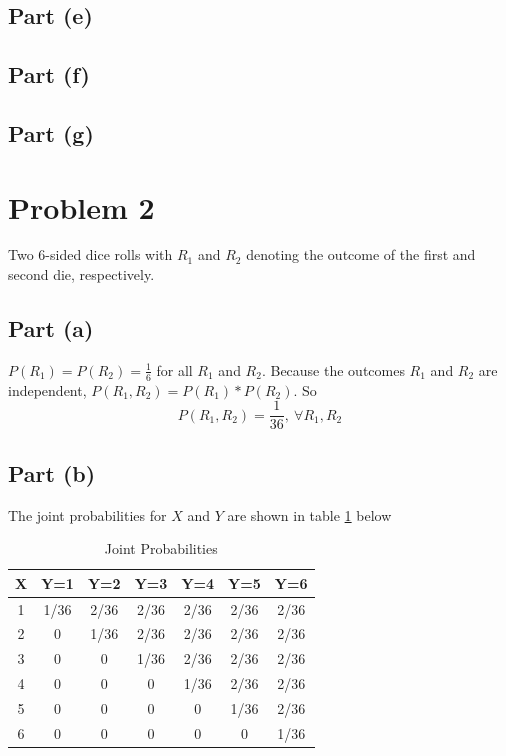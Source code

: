 \documentclass[11pt]{article}
\begin{document}
\subsection*{Part (e)}
\subsection*{Part (f)}
\subsection*{Part (g)}
\section*{Problem 2}
Two 6-sided dice rolls with $R_1$ and $R_2$ denoting the outcome of the first and second die, respectively.

\subsection*{Part (a)}
$P(R_1)=P(R_2)=\frac{1}{6}$ for all $R_1$ and $R_2$. Because the outcomes $R_1$ and $R_2$ are independent, $P(R_1,R_2)=P(R_1)*P(R_2)$. So
\begin{equation*}
	P(R_1,R_2)=\frac{1}{36},\ \forall R_1,R_2
\end{equation*}

\subsection*{Part (b)}
The joint probabilities for $X$ and $Y$ are shown in table \ref{joints} below
\begin{table}[h!]
  \begin{center}
    \caption{Joint Probabilities}
    \label{joints}
    \begin{tabular}{c|c|c|c|c|c|c} %
      X & Y=1 & Y=2 & Y=3 & Y=4 & Y=5 & Y=6 \\
      \hline
      1 & 1/36 & 2/36 & 2/36 & 2/36 & 2/36 & 2/36 \\
      2 & 0 & 1/36 & 2/36 & 2/36 & 2/36 & 2/36 \\
      3 & 0 & 0 & 1/36 & 2/36 & 2/36 & 2/36 \\
      4 & 0 & 0 & 0 & 1/36 & 2/36 & 2/36 \\
      5 & 0 & 0 & 0 & 0 & 1/36 & 2/36 \\
      6 & 0 & 0 & 0 & 0 & 0 & 1/36 \\
    \end{tabular}
  \end{center}
\end{table}
\end{document}
